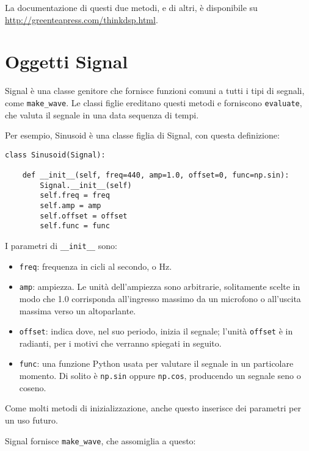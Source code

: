 \documentclass[12pt]{book} \usepackage[width=5.5in,height=8.5in, hmarginratio=3:2,vmarginratio=1:1]{geometry}
\begin{document}
La documentazione di questi due metodi, e di altri, è disponibile su \url{http://greenteapress.com/thinkdsp.html}.

\section{Oggetti Signal} \label{sigobs} 

Signal è una classe genitore che fornisce funzioni comuni a tutti i tipi di segnali, come \verb"make_wave". Le classi figlie ereditano questi metodi e forniscono {\tt evaluate}, che valuta il segnale in una data sequenza di tempi.

Per esempio, Sinusoid è una classe figlia di Signal, con questa definizione:

\begin{verbatim} 
class Sinusoid(Signal):

    def __init__(self, freq=440, amp=1.0, offset=0, func=np.sin):
        Signal.__init__(self)
        self.freq = freq
        self.amp = amp
        self.offset = offset
        self.func = func
 \end{verbatim} 

I parametri di \verb"__init__" sono:

\begin{itemize} 

\item {\tt freq}: frequenza in cicli al secondo, o Hz.

\item {\tt amp}: ampiezza. Le unità dell'ampiezza sono arbitrarie, solitamente scelte in modo che 1.0 corrisponda all'ingresso massimo da un microfono o all'uscita massima verso un altoparlante.

\item {\tt offset}: indica dove, nel suo periodo, inizia il segnale; l'unità {\tt offset} è in radianti, per i motivi che verranno spiegati in seguito.

\item {\tt func}: una funzione Python usata per valutare il segnale in un particolare momento. Di solito è {\tt np.sin} oppure {\tt np.cos}, producendo un segnale seno o coseno.

\end{itemize} 

Come molti metodi di inizializzazione, anche questo inserisce dei parametri per un uso futuro.

Signal fornisce \verb"make_wave", che assomiglia a questo:
\end{document}

